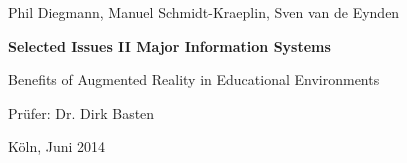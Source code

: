 \vspace*{1mm}

\thispagestyle{empty}
Phil Diegmann, Manuel Schmidt-Kraeplin, Sven van de Eynden

\vspace*{32mm}

% 
\begin{center}
\textbf{
    Selected Issues II
\linebreak
    Major Information Systems
}
\end{center}

\vspace*{32mm}

\begin{center}
\LARGE 
Benefits of Augmented Reality in Educational Environments
\end{center}

\vspace*{32mm}

\begin{center}
Prüfer: Dr. Dirk Basten
\end{center}

\vspace*{32mm}

\begin{center}
Köln, Juni 2014
\end{center}